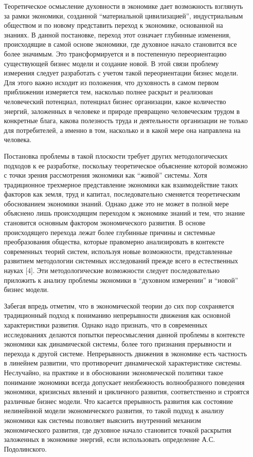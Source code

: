 \begin{multicols}{2}
Теоретическое осмысление духовности в экономике дает возможность
взглянуть за рамки экономики, созданной ``материальной цивилизацией'',
индустриальным обществом и по новому представить переход к экономике,
основанной на знаниях. В данной постановке, переход этот означает
глубинные изменения, происходящие в самой основе экономики, где духовное
начало становится все более значимым. Это трансформируется и в
постепенную переориентацию существующей бизнес модели и создание новой.
В этой связи проблему измерения следует разработать с учетом такой
переориентации бизнес модели. Для этого важно исходит из положения, что
духовность в самом первом приближении измеряется тем, насколько полнее
раскрыт и реализован человеческий потенциал, потенциал бизнес
организации, какое количество энергий, заложенных в человеке и природе
превращено человеческим трудом в конкретные блага, какова полезность
труда и деятельности организации не только для потребителей, а именно в
том, насколько и в какой мере она направлена на человека.

Постановка проблемы в такой плоскости требует других методологических
подходов к ее разработке, поскольку теоретическое объяснение которой
возможно с точки зрения рассмотрения экономики как ``живой'' системы.
Хотя традиционное трехмерное представление экономики как взаимодействие
таких факторов как земля, труд и капитал, последовательно сменяется
теоретическим обоснованием экономики знаний. Однако даже это не может в
полной мере объяснено лишь происходящим переходом к экономике знаний и
тем, что знание становится основным фактором экономического развития. В
основе происходящего перехода лежат более глубинные причины и системные
преобразования общества, которые правомерно анализировать в контексте
современных теорий систем, используя новые возможности, представленные
развитием методологии системных исследований прежде всего в естественных
науках {[}4{]}. Эти методологические возможности следует последовательно
приложить к анализу проблемы экономики в ``духовном измерении'' и
``новой'' бизнес модели.

Забегая впредь отметим, что в экономической теории до сих пор
сохраняется традиционный подход к пониманию непрерывности движения как
основной характеристики развития. Однако надо признать, что в
современных исследованиях делаются попытки переосмысления данной
проблемы в контексте экономики как динамической системы, более того
признания прерывности и перехода к другой системе. Непрерывность
движения в экономике есть частность в линейнем развитии, что
противоречит динамической характеристике системы. Неслучайно, на
практике и в обосновании экономической политики такое понимание
экономики всегда допускает неизбежность волнообразного поведения
экономики, кризисных явлений и цикличного развития, соответственно и
строятся различные бизнес модели. Что касается прерывность развития как
состояние нелинейнной модели экономического развития, то такой подход к
анализу экономики как системы позволяет выяснить внутренний механизм
экономического развития, где духовное начало становится точкой раскрытия
заложенных в экономике энергий, если использовать определение А.С.
Подолинского.


\end{multicols}
